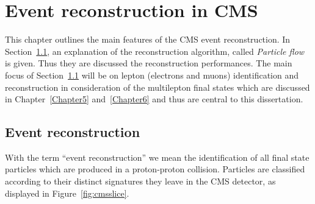 \chapter{Event reconstruction in CMS} \label{Chapter2_5} 



This chapter outlines the main features of the CMS event
reconstruction. In Section~\ref{sec:reconstruction}, an explanation of
the reconstruction algorithm, called \emph{Particle flow} is
given. Thus they are discussed the reconstruction performances. The main focus of Section~\ref{sec:reconstruction} will be on lepton (electrons and muons) identification and
reconstruction in consideration of the multilepton final states which are
discussed in Chapter~\ref{Chapter5} and~\ref{Chapter6} and thus are
central to this dissertation.


\section{Event reconstruction}\label{sec:reconstruction}
With the term ``event reconstruction'' we mean the identification of
all final state particles which are produced in a proton-proton
collision. Particles are classified according to their distinct
signatures they leave in 
the CMS detector, as displayed in Figure~\ref{fig:cmsslice}.

